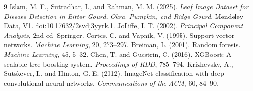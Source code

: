 \begin{thebibliography}{9}
 Islam, M. F., Sutradhar, I., and Rahman, M. M. (2025). \textit{Leaf Image Dataset for Disease Detection in Bitter Gourd, Okra, Pumpkin, and Ridge Gourd}, Mendeley Data, V1. doi:10.17632/2svdj3yyrk.1.
 Jolliffe, I. T. (2002). \textit{Principal Component Analysis}, 2nd ed. Springer.
 Cortes, C. and Vapnik, V. (1995). Support-vector networks. \textit{Machine Learning}, 20, 273--297.
 Breiman, L. (2001). Random forests. \textit{Machine Learning}, 45, 5--32.
 Chen, T. and Guestrin, C. (2016). XGBoost: A scalable tree boosting system. \textit{Proceedings of KDD}, 785--794.
 Krizhevsky, A., Sutskever, I., and Hinton, G. E. (2012). ImageNet classification with deep convolutional neural networks. \textit{Communications of the ACM}, 60, 84--90.
\end{thebibliography}
